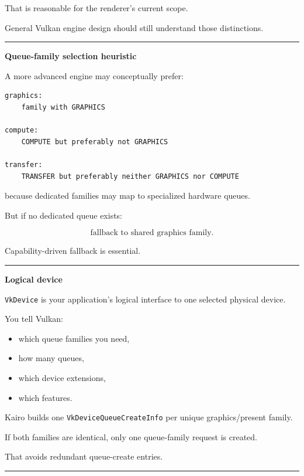 That is reasonable for the renderer's current scope.

General Vulkan engine design should still understand those distinctions.

\begin{center}\rule{0.5\linewidth}{0.5pt}\end{center}

\textbf{Queue-family selection heuristic}

A more advanced engine may conceptually prefer:

\begin{verbatim}
graphics:
    family with GRAPHICS

compute:
    COMPUTE but preferably not GRAPHICS

transfer:
    TRANSFER but preferably neither GRAPHICS nor COMPUTE
\end{verbatim}

because dedicated families may map to specialized hardware queues.

But if no dedicated queue exists:

\[
\boxed{
\text{fallback to shared graphics family}.
}
\]

Capability-driven fallback is essential.

\begin{center}\rule{0.5\linewidth}{0.5pt}\end{center}

\textbf{Logical device}

\texttt{VkDevice} is your application's logical interface to one selected physical device.

You tell Vulkan:

\begin{itemize}
\tightlist
\item
  which queue families you need,
\item
  how many queues,
\item
  which device extensions,
\item
  which features.
\end{itemize}

Kairo builds one \texttt{VkDeviceQueueCreateInfo} per unique graphics/present family.

If both families are identical, only one queue-family request is created.

That avoids redundant queue-create entries.

\begin{center}\rule{0.5\linewidth}{0.5pt}\end{center}

